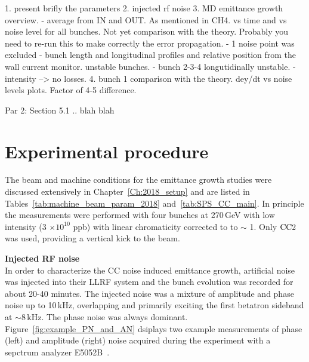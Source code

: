 \vspace*{-1mm}

1. present brifly the parameters
2. injected rf noise
3. MD emittance growth overview. 
    - average from IN and OUT. As mentioned in CH4. vs time and vs noise level for all bunches. Not yet comparison with the theory. Probably you need to re-run this to make correctly the error propagation. 
    - 1 noise point was excluded
    - bunch length and longitudinal profiles and relative position from the wall current monitor.  unstable bunches.
    - bunch 2-3-4 longutidinally unstable.
    - intensity --> no losses.
4. bunch 1 comparison with the theory. dey/dt vs noise levels plots. Factor of 4-5 difference. 

Par 2: Section 5.1 .. blah blah

\section{Experimental procedure}
\begin{sloppypar} %
The beam and machine conditions for the emittance growth studies were discussed extensively in Chapter~\ref{Ch:2018_setup} and are listed in Tables~\ref{tab:machine_beam_param_2018} and~\ref{tab:SPS_CC_main}. In principle the measurements were performed with four bunches at 270\,GeV with low intensity (3 $\times \mathrm{10^{10}}$ ppb) with linear chromaticity corrected to to $\sim$ 1. Only ${\mathrm{CC}}2$ was used, providing a vertical kick to the beam.
\end{sloppypar} %


\normalsize{\textbf{Injected RF noise}}\\
 In order to characterize the CC noise induced emittance growth, artificial noise was injected into their LLRF system and the bunch evolution was recorded for about 20-40 minutes. The injected noise was a mixture of amplitude and phase noise up to 10\,kHz, overlapping and primarily exciting the first betatron sideband at $\sim 8$\,kHz. The phase noise was always dominant. Figure~\ref{fig:example_PN_and_AN} dsiplays two example measurements of phase (left) and amplitude (right) noise acquired during the experiment with a sepctrum analyzer E5052B~\cite{E5052B_insight}. 


